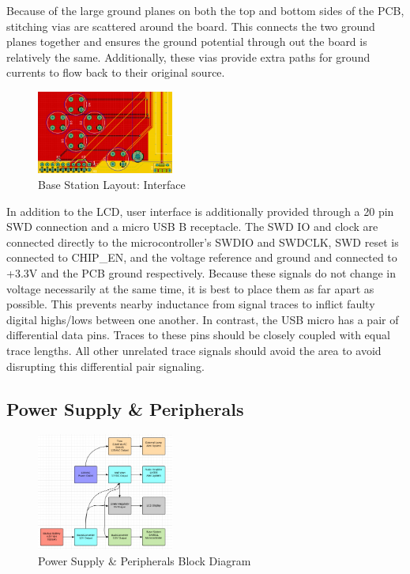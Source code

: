 \documentclass[journal,compsoc]{IEEEtran}
\begin{document}
Because of the large ground planes on both the top and bottom sides of the PCB, stitching vias are scattered around the board. This connects the two ground planes together and ensures the ground potential through out the board is relatively the same. Additionally, these vias provide extra paths for ground currents to flow back to their original source.

\begin{figure}[ht] 	%
\centering
\includegraphics[width=0.4\textwidth]{base-layout-interface.PNG}
\caption{ \space Base Station Layout: Interface}
\label{base-lay-btn}
\end{figure}

In addition to the LCD, user interface is additionally provided through a 20 pin SWD connection and a micro USB B receptacle. The SWD IO and clock are connected directly to the microcontroller's SWDIO and SWDCLK, SWD reset is connected to CHIP\_EN, and the voltage reference and ground and connected to +3.3V and the PCB ground respectively. Because these signals do not change in voltage necessarily at the same time, it is best to place them as far apart as possible. This prevents nearby inductance from signal traces to inflict faulty digital highs/lows between one another. In contrast, the USB micro has a pair of differential data pins. Traces to these pins should be closely coupled with equal trace lengths. All other unrelated trace signals should avoid the area to avoid disrupting this differential pair signaling.

\subsection {Power Supply \& Peripherals}

\begin{figure}[ht] 	%
\centering
\includegraphics[width=0.4\textwidth]{BlockDiagram.png}
\caption{ \space Power Supply \& Peripherals Block Diagram}
\label{Psupply}
\end{figure}
\end{document}
